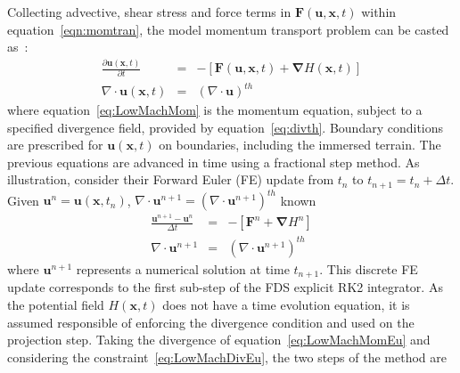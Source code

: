 \documentclass[journal,article,atmosphere,submit,moreauthors,pdftex]{Definitions/mdpi}
\begin{document}
Collecting advective, shear stress and force terms in $\mathbf{F}(\mathbf{u},\mathbf{x},t)$ within equation~\ref{eqn:momtran}, the model momentum transport problem can be casted as~\cite{mcgratta_2013}:
%
\begin{eqnarray}
  \frac{\partial \mathbf{u}(\mathbf{x},t)}{\partial t} &=& - \left[ \mathbf{F}(\mathbf{u},\mathbf{x},t) + \boldsymbol{\nabla} H(\mathbf{x},t) \right ]\label{eq:LowMachMom} \\
         \nabla \cdot \mathbf{u} (\mathbf{x},t) & = & \left(\nabla \cdot \mathbf{u} \right)^{th} \label{eq:LowMachDiv}
\end{eqnarray}
%
where equation~\eqref{eq:LowMachMom} is the momentum equation, subject to a specified divergence field, provided by equation~\eqref{eq:divth}.
Boundary conditions are prescribed for $\mathbf{u}(\mathbf{x},t)$ on boundaries, including the immersed terrain.
The previous equations are advanced in time using a fractional step method. As illustration, consider their Forward Euler (FE) update from $t_n$ to $t_{n+1}=t_n + \Delta t$. Given $ \mathbf{u}^n=\mathbf{u}(\mathbf{x},t_n)$, $\nabla \cdot \mathbf{u}^{n+1} = \left( \nabla \cdot \mathbf{u}^{n+1} \right)^{th}$ known
%
\begin{eqnarray}
  \frac{\mathbf{u}^{n+1}-\mathbf{u}^{n}}{\Delta t} &=& - \left[ \mathbf{F}^n +  \boldsymbol{\nabla} H^n \right] \label{eq:LowMachMomEu}\\
  \nabla \cdot \mathbf{u}^{n+1} &=& \left( \nabla \cdot \mathbf{u}^{n+1} \right)^{th} \label{eq:LowMachDivEu}
\end{eqnarray}
%
where $\mathbf{u}^{n+1}$ represents a numerical solution at time $t_{n+1}$. This discrete FE update corresponds to the first sub-step of the FDS explicit RK2 integrator. As the potential field $H(\mathbf{x},t)$ does not have a time evolution equation, it is assumed responsible of enforcing the divergence condition and used on the projection step. Taking the divergence of equation~\eqref{eq:LowMachMomEu} and considering  the constraint~\eqref{eq:LowMachDivEu}, the two steps of the method are
%
\end{document}
